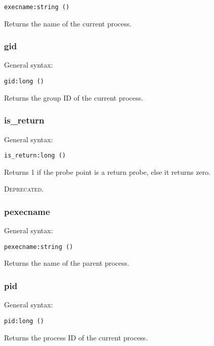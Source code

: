 \documentclass[twoside,english]{article}
\newcommand{\noun}[1]{\textsc{#1}}
\newenvironment{vindent}
{\begin{list}{}{\setlength{\listparindent}{6pt}}
\item[]}
{\end{list}}
\begin{document}
\begin{vindent}
\begin{verbatim}
execname:string ()
\end{verbatim}
\end{vindent}
Returns the name of the current process.


\subsubsection{gid}
General syntax:

\begin{vindent}
\begin{verbatim}
gid:long ()
\end{verbatim}
\end{vindent}
Returns the group ID of the current process.


\subsubsection{is\_return}
General syntax:

\begin{vindent}
\begin{verbatim}
is_return:long ()
\end{verbatim}
\end{vindent}
Returns 1 if the probe point is a return probe, else it returns
zero.

\noun{Deprecated}.


\subsubsection{pexecname}
General syntax:

\begin{vindent}
\begin{verbatim}
pexecname:string ()
\end{verbatim}
\end{vindent}
Returns the name of the parent process.


\subsubsection{pid}
General syntax:

\begin{vindent}
\begin{verbatim}
pid:long ()
\end{verbatim}
\end{vindent}
Returns the process ID of the current process.
\end{document}
